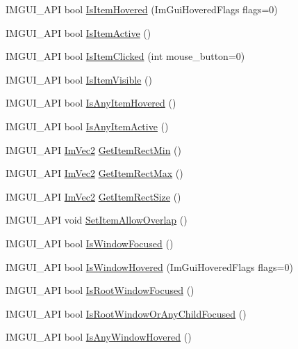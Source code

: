 \begin{DoxyCompactItemize}
\item 
I\+M\+G\+U\+I\+\_\+\+A\+PI bool \hyperlink{namespace_im_gui_ac9a400eff3a9561d95e80486c52a660b}{Is\+Item\+Hovered} (Im\+Gui\+Hovered\+Flags flags=0)
\item 
I\+M\+G\+U\+I\+\_\+\+A\+PI bool \hyperlink{namespace_im_gui_a2d8ac4569456a8003e4dddd39caf771c}{Is\+Item\+Active} ()
\item 
I\+M\+G\+U\+I\+\_\+\+A\+PI bool \hyperlink{namespace_im_gui_a0b5780dbd580e28f5d31f39da80b0b01}{Is\+Item\+Clicked} (int mouse\+\_\+button=0)
\item 
I\+M\+G\+U\+I\+\_\+\+A\+PI bool \hyperlink{namespace_im_gui_a0e9273fc53bdf7ca39d59cdb657c3c2f}{Is\+Item\+Visible} ()
\item 
I\+M\+G\+U\+I\+\_\+\+A\+PI bool \hyperlink{namespace_im_gui_a0512146617bb55e24ebcfbe3ce6553d5}{Is\+Any\+Item\+Hovered} ()
\item 
I\+M\+G\+U\+I\+\_\+\+A\+PI bool \hyperlink{namespace_im_gui_acdc18199d50d26919312db5f9707b8dc}{Is\+Any\+Item\+Active} ()
\item 
I\+M\+G\+U\+I\+\_\+\+A\+PI \hyperlink{struct_im_vec2}{Im\+Vec2} \hyperlink{namespace_im_gui_a65b24b72ec0e8444c705cebf3e91f570}{Get\+Item\+Rect\+Min} ()
\item 
I\+M\+G\+U\+I\+\_\+\+A\+PI \hyperlink{struct_im_vec2}{Im\+Vec2} \hyperlink{namespace_im_gui_a3d260209b8dc25a2c942e8cfd1ed0e51}{Get\+Item\+Rect\+Max} ()
\item 
I\+M\+G\+U\+I\+\_\+\+A\+PI \hyperlink{struct_im_vec2}{Im\+Vec2} \hyperlink{namespace_im_gui_a3303d1c37041307e11fd46fc43b2274d}{Get\+Item\+Rect\+Size} ()
\item 
I\+M\+G\+U\+I\+\_\+\+A\+PI void \hyperlink{namespace_im_gui_a3291356b06ebe5f771d60b334a831d4b}{Set\+Item\+Allow\+Overlap} ()
\item 
I\+M\+G\+U\+I\+\_\+\+A\+PI bool \hyperlink{namespace_im_gui_a1bc0d66039324e071c7d1ae20f9b1211}{Is\+Window\+Focused} ()
\item 
I\+M\+G\+U\+I\+\_\+\+A\+PI bool \hyperlink{namespace_im_gui_aaed1ebf40cc2cb2ec30b0ba39b91d4a5}{Is\+Window\+Hovered} (Im\+Gui\+Hovered\+Flags flags=0)
\item 
I\+M\+G\+U\+I\+\_\+\+A\+PI bool \hyperlink{namespace_im_gui_abf8f15c7648d453142b0dc72bc5ed8ba}{Is\+Root\+Window\+Focused} ()
\item 
I\+M\+G\+U\+I\+\_\+\+A\+PI bool \hyperlink{namespace_im_gui_ad7175b87a80da527fb5ba5bc75993091}{Is\+Root\+Window\+Or\+Any\+Child\+Focused} ()
\item 
I\+M\+G\+U\+I\+\_\+\+A\+PI bool \hyperlink{namespace_im_gui_a62379e94283e247288c9a6c15a2b797e}{Is\+Any\+Window\+Hovered} ()

\end{DoxyCompactItemize}

